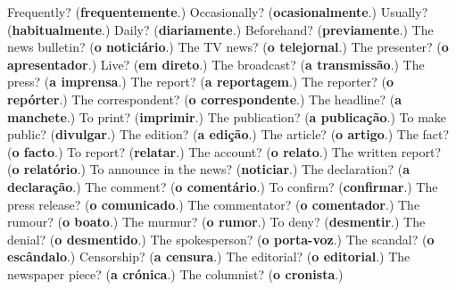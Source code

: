 \begin{tcolorbox}[breakable,colback=teal!4,colframe=teal!35!black,title={Before you move on}]
Frequently? (\textbf{frequentemente}.) Occasionally? (\textbf{ocasionalmente}.) Usually? (\textbf{habitualmente}.) Daily? (\textbf{diariamente}.) Beforehand? (\textbf{previamente}.) The news bulletin? (\textbf{o noticiário}.) The TV news? (\textbf{o telejornal}.) The presenter? (\textbf{o apresentador}.) Live? (\textbf{em direto}.) The broadcast? (\textbf{a transmissão}.) The press? (\textbf{a imprensa}.) The report? (\textbf{a reportagem}.) The reporter? (\textbf{o repórter}.) The correspondent? (\textbf{o correspondente}.) The headline? (\textbf{a manchete}.) To print? (\textbf{imprimir}.) The publication? (\textbf{a publicação}.) To make public? (\textbf{divulgar}.) The edition? (\textbf{a edição}.) The article? (\textbf{o artigo}.) The fact? (\textbf{o facto}.) To report? (\textbf{relatar}.) The account? (\textbf{o relato}.) The written report? (\textbf{o relatório}.) To announce in the news? (\textbf{noticiar}.) The declaration? (\textbf{a declaração}.) The comment? (\textbf{o comentário}.) To confirm? (\textbf{confirmar}.) The press release? (\textbf{o comunicado}.) The commentator? (\textbf{o comentador}.) The rumour? (\textbf{o boato}.) The murmur? (\textbf{o rumor}.) To deny? (\textbf{desmentir}.) The denial? (\textbf{o desmentido}.) The spokesperson? (\textbf{o porta-voz}.) The scandal? (\textbf{o escândalo}.) Censorship? (\textbf{a censura}.) The editorial? (\textbf{o editorial}.) The newspaper piece? (\textbf{a crónica}.) The columnist? (\textbf{o cronista}.)
\end{tcolorbox}
